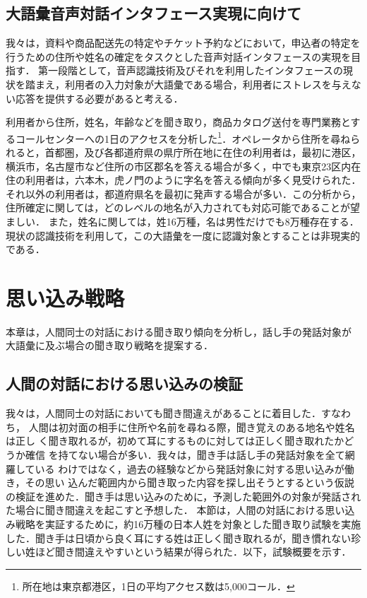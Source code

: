 \subsection{大語彙音声対話インタフェース実現に向けて}
\label{two-three}
我々は，資料や商品配送先の特定やチケット予約などにおいて，申込者の特定を行うための住所や姓名の確定をタスクとした音声対話インタフェースの実現を目指す．
第一段階として，音声認識技術及びそれを利用したインタフェースの現状を踏まえ，利用者の入力対象が大語彙である場合，利用者にストレスを与えない応答を提供する必要があると考える．

利用者から住所，姓名，年齢などを聞き取り，商品カタログ送付を専門業務とするコールセンターへの1日のアクセスを分析した\footnote{所在地は東京都港区，1日の平均アクセス数は5,000コール．}．オペレータから住所を尋ねられると，首都圏，及び各都道府県の県庁所在地に在住の利用者は，最初に港区，横浜市，名古屋市など住所の市区郡名を答える場合が多く，中でも東京23区内在住の利用者は，六本木，虎ノ門のように字名を答える傾向が多く見受けられた．それ以外の利用者は，都道府県名を最初に発声する場合が多い．この分析から，住所確定に関しては，どのレベルの地名が入力されても対応可能であることが望ましい．
また，姓名に関しては，姓16万種，名は男性だけでも8万種存在する\cite{name}．現状の認識技術を利用して，この大語彙を一度に認識対象とすることは非現実的である．

\section{思い込み戦略}
\label{three}
本章は，人間同士の対話における聞き取り傾向を分析し，話し手の発話対象が
大語彙に及ぶ場合の聞き取り戦略を提案する．
\subsection{人間の対話における思い込みの検証}
\label{three-one}
我々は，人間同士の対話においても聞き間違えがあることに着目した．すなわち，
人間は初対面の相手に住所や名前を尋ねる際，聞き覚えのある地名や姓名は正し
く聞き取れるが，初めて耳にするものに対しては正しく聞き取れたかどうか確信
を持てない場合が多い．我々は，聞き手は話し手の発話対象を全て網羅している
わけではなく，過去の経験などから発話対象に対する思い込みが働き，その思い
込んだ範囲内から聞き取った内容を探し出そうとするという仮説の検証を進めた．聞き手は思い込みのために，予測した範囲外の対象が発話された場合に聞き間違えを起こすと予想した．
本節は，人間の対話における思い込み戦略を実証するために，約16万種の日本人姓を対象とした聞き取り試験を実施した．聞き手は日頃から良く耳にする姓は正しく聞き取れるが，聞き慣れない珍しい姓ほど聞き間違えやすいという結果が得られた．以下，試験概要を示す．

